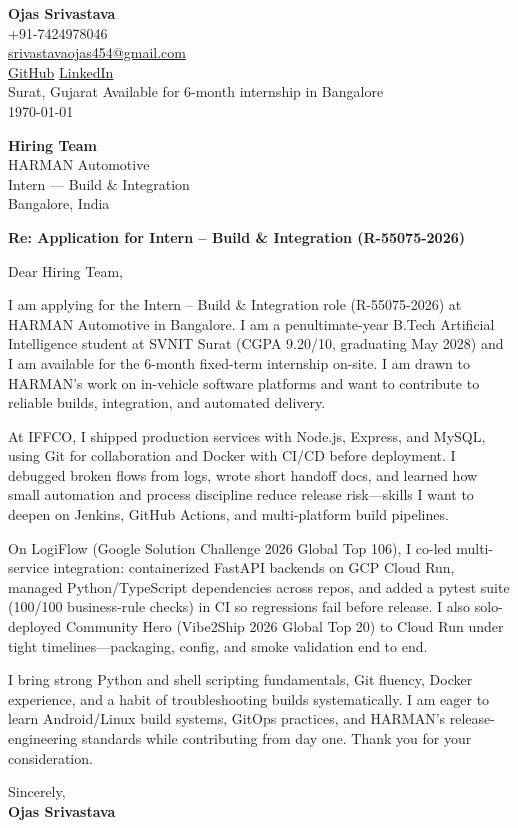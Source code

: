 \documentclass[a4paper,11pt]{article}
\begin{document}
\begin{flushright}
\textbf{Ojas Srivastava} \\
+91-7424978046 \\
\href{mailto:srivastavaojas454@gmail.com}{srivastavaojas454@gmail.com} \\
\href{https://github.com/Ojas-Srivastava05}{GitHub} \textbar{}
\href{https://linkedin.com/in/ojas-srivastava05}{LinkedIn} \\
Surat, Gujarat \textbar{} Available for 6-month internship in Bangalore \\
\today
\end{flushright}

\vspace{4mm}
\textbf{Hiring Team} \\
HARMAN Automotive \\
Intern --- Build \& Integration \\
Bangalore, India

\vspace{2mm}
\textbf{Re: Application for Intern -- Build \& Integration (R-55075-2026)}

Dear Hiring Team,

I am applying for the Intern -- Build \& Integration role (R-55075-2026) at HARMAN Automotive in Bangalore. I am a penultimate-year B.Tech Artificial Intelligence student at SVNIT Surat (CGPA 9.20/10, graduating May 2028) and I am available for the 6-month fixed-term internship on-site. I am drawn to HARMAN's work on in-vehicle software platforms and want to contribute to reliable builds, integration, and automated delivery.

At IFFCO, I shipped production services with Node.js, Express, and MySQL, using Git for collaboration and Docker with CI/CD before deployment. I debugged broken flows from logs, wrote short handoff docs, and learned how small automation and process discipline reduce release risk---skills I want to deepen on Jenkins, GitHub Actions, and multi-platform build pipelines.

On LogiFlow (Google Solution Challenge 2026 Global Top 106), I co-led multi-service integration: containerized FastAPI backends on GCP Cloud Run, managed Python/TypeScript dependencies across repos, and added a pytest suite (100/100 business-rule checks) in CI so regressions fail before release. I also solo-deployed Community Hero (Vibe2Ship 2026 Global Top 20) to Cloud Run under tight timelines---packaging, config, and smoke validation end to end.

I bring strong Python and shell scripting fundamentals, Git fluency, Docker experience, and a habit of troubleshooting builds systematically. I am eager to learn Android/Linux build systems, GitOps practices, and HARMAN's release-engineering standards while contributing from day one. Thank you for your consideration.

Sincerely, \\
\vspace{8mm}
\textbf{Ojas Srivastava}
\end{document}
